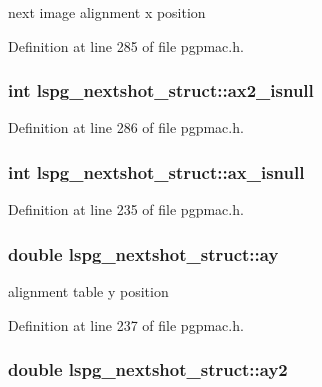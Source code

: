 next image alignment x position 



Definition at line 285 of file pgpmac.\-h.

\hypertarget{structlspg__nextshot__struct_a846845b0b9ecf6517ef85554771ec71d}{
\subsubsection[{ax2\-\_\-isnull}]{\setlength{\rightskip}{0pt plus 5cm}int lspg\-\_\-nextshot\-\_\-struct\-::ax2\-\_\-isnull}}\label{structlspg__nextshot__struct_a846845b0b9ecf6517ef85554771ec71d}


Definition at line 286 of file pgpmac.\-h.

\hypertarget{structlspg__nextshot__struct_aae46c7911b2b218497ad4a68f3dbb7d9}{
\subsubsection[{ax\-\_\-isnull}]{\setlength{\rightskip}{0pt plus 5cm}int lspg\-\_\-nextshot\-\_\-struct\-::ax\-\_\-isnull}}\label{structlspg__nextshot__struct_aae46c7911b2b218497ad4a68f3dbb7d9}


Definition at line 235 of file pgpmac.\-h.

\hypertarget{structlspg__nextshot__struct_a9e20b9a0aeb41f7f7d653a1c60335bf1}{
\subsubsection[{ay}]{\setlength{\rightskip}{0pt plus 5cm}double lspg\-\_\-nextshot\-\_\-struct\-::ay}}\label{structlspg__nextshot__struct_a9e20b9a0aeb41f7f7d653a1c60335bf1}


alignment table y position 



Definition at line 237 of file pgpmac.\-h.

\hypertarget{structlspg__nextshot__struct_ad13759740204b42e379161f98815f3d0}{
\subsubsection[{ay2}]{\setlength{\rightskip}{0pt plus 5cm}double lspg\-\_\-nextshot\-\_\-struct\-::ay2}}\label{structlspg__nextshot__struct_ad13759740204b42e379161f98815f3d0}


